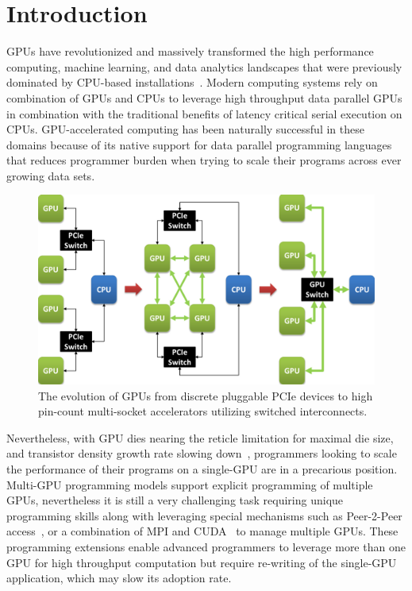 \section{Introduction}
\label{introduction}

GPUs have revolutionized and massively transformed the high
performance computing, machine learning, and data analytics landscapes that were
previously dominated by CPU-based
installations~\cite{pascal,intersect360,cudnn,Lavin15b,SimonyanZ14a}. Modern
computing systems rely on combination of GPUs and CPUs to leverage high
throughput data parallel GPUs in combination with the traditional benefits of
latency critical serial execution on CPUs. GPU-accelerated computing has been
naturally successful in these domains because of its native support for data parallel
programming languages~\cite{CUDA7,OPENCL} that reduces programmer burden when
trying to scale their programs across ever growing data sets.

\begin{figure}[t]
\centering
\includegraphics[width=1.0\columnwidth]{figures/inter_gpu_connections.pdf}
\caption{The evolution of GPUs from discrete pluggable PCIe devices to high pin-count 
multi-socket accelerators utilizing switched interconnects.}
\label{fig:systemdiagram}
\vspace{-.15in}
\end{figure}

Nevertheless, with GPU dies nearing the reticle limitation for maximal die size, and transistor
density growth rate slowing down~\cite{mooredead2016}, programmers looking to
scale the performance of their programs on a single-GPU are in a precarious
position. Multi-GPU programming models support explicit programming of multiple GPUs,
nevertheless it is still a very challenging task requiring unique programming skills
along with leveraging special mechanisms such as Peer-2-Peer
access~\cite{NVIDIAP2P}, or a combination of MPI and CUDA~\cite{NVIDIAMPI} to
manage multiple GPUs. These programming extensions enable advanced programmers
to leverage more than one GPU for high throughput computation but require
re-writing of the single-GPU application, which may slow its adoption rate. 

